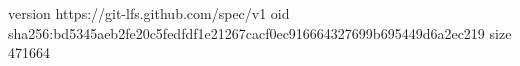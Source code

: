 version https://git-lfs.github.com/spec/v1
oid sha256:bd5345aeb2fe20c5fedfdf1e21267cacf0ec916664327699b695449d6a2ec219
size 471664
